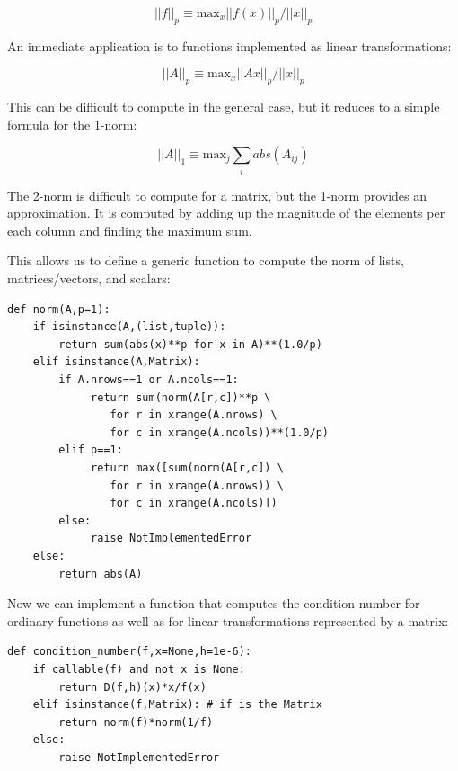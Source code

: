 \documentclass[justified,sixbynine]{tufte-book}
\def\ft{\small\tt}
\theoremstyle{plain}%
\theoremstyle{definition}
\theoremstyle{remark}
\begin{document}
\begin{fullwidth}
\begin{equation}
||f||_p \equiv \textrm{max}_x ||f(x)||_p / ||x||_p
\end{equation}

An immediate application is to functions implemented as linear transformations:

\begin{equation}
||A||_p \equiv \textrm{max}_x ||Ax||_p / ||x||_p
\end{equation}

This can be difficult to compute in the general case, but it reduces to a simple formula for the 1-norm:

\begin{equation}
||A||_1 \equiv \textrm{max}_j \sum_i abs(A_{ij})
\end{equation}

The 2-norm is difficult to compute for a matrix, but the 1-norm provides an approximation. It is computed by adding up the magnitude of the elements per each column and finding the maximum sum.

This allows us to define a generic function to compute the norm of lists, matrices/vectors, and scalars:

\begin{lstlisting}[caption={in file: {\ft nlib.py}}]
def norm(A,p=1):
    if isinstance(A,(list,tuple)):
        return sum(abs(x)**p for x in A)**(1.0/p)
    elif isinstance(A,Matrix):
        if A.nrows==1 or A.ncols==1:
             return sum(norm(A[r,c])**p \
                for r in xrange(A.nrows) \
                for c in xrange(A.ncols))**(1.0/p)
        elif p==1:
             return max([sum(norm(A[r,c]) \
                for r in xrange(A.nrows)) \
                for c in xrange(A.ncols)])
        else:
             raise NotImplementedError
    else:
        return abs(A)
\end{lstlisting}

Now we can implement a function that computes the condition number for ordinary functions as well as for linear transformations represented by a matrix:

\begin{lstlisting}[caption={in file: {\ft nlib.py}}]
def condition_number(f,x=None,h=1e-6):
    if callable(f) and not x is None:
        return D(f,h)(x)*x/f(x)
    elif isinstance(f,Matrix): # if is the Matrix
        return norm(f)*norm(1/f)
    else:
        raise NotImplementedError
\end{lstlisting}


\end{fullwidth}
\end{document}
